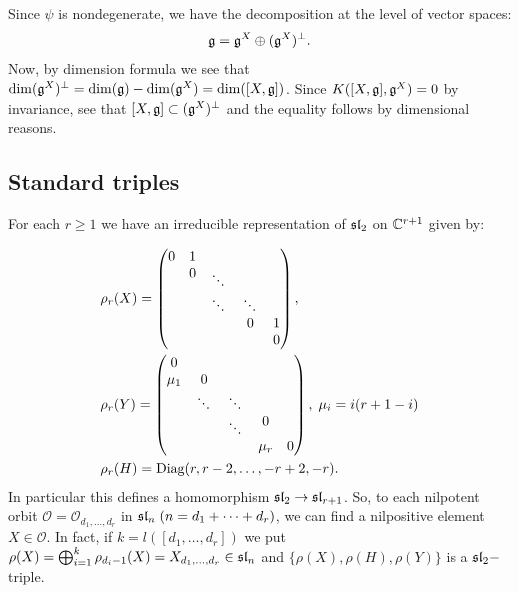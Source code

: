 \begin{dang}
    \begin{remark}
        Since $\psi$ is nondegenerate, we have the decomposition at the level of vector spaces:
        \begin{equation}
            \mathfrak{g}=\mathfrak{g}^X\oplus(\mathfrak{g}^X)^\perp.
        \end{equation}
        Now, by dimension formula we see that $\dim(\mathfrak{g}^X)^\perp=\dim(\mathfrak{g})-\dim(\mathfrak{g}^X)=\dim([X,\mathfrak{g}])$.
        Since $K([X,\mathfrak{g}],\mathfrak{g}^X)=0$ by invariance, see that $[X,\mathfrak{g}]\subset(\mathfrak{g}^X)^\perp$ and the equality
        follows by dimensional reasons.
    \end{remark}
\end{dang}
\subsection{Standard triples}
For each $r\geq1$ we have an irreducible representation of $\mathfrak{sl}_2$ on $\mathbb{C}^{r+1}$ given by:

  \begin{equation}\label{equation: sl2 triples for sln}
    \begin{split}
        &\rho_r(X)=\begin{pmatrix}
0&1&&&\\ &0&\rotatebox{-45}{$\cdots$}&&\\ &&\rotatebox{-45}{$\cdots$}&\rotatebox{-45}{$\cdots$}&\\&&&0&1\\&&&&0
\end{pmatrix},\\
        &\rho_r(Y)=\begin{pmatrix}
    0&&&&\\ \mu_1&0&&&\\ &\rotatebox{-45}{$\cdots$}&\rotatebox{-45}{$\cdots$}&&\\ &&\rotatebox{-45}{$\cdots$}&0&\\ &&&\mu_r&0
\end{pmatrix},\;\mu_i=i(r+1-i)\\
        &\rho_r(H)=\text{Diag}(r,r-2,\dots,-r+2,-r).
    \end{split}
  \end{equation}
In particular this defines a homomorphism $\mathfrak{sl}_2\to\mathfrak{sl}_{r+1}$. So, to each nilpotent orbit 
    $\mathcal{O}=\mathcal{O}_{d_1,\dots, d_r}$ in $\mathfrak{sl}_n\;(n=d_1+\cdots+d_r)$, we can find a nilpositive element 
$X\in\mathcal{O}$. In fact, if $k=l([d_1,\dots,d_r])$ we put 
$\rho(X)=\bigoplus_{i=1}^k\rho_{d_i-1}(X)=X_{d_1,\dots, d_r}\in\mathfrak{sl}_n$ and 
$\{\rho(X),\rho(H),\rho(Y)\}$ is a $\mathfrak{sl}_2-$triple.




